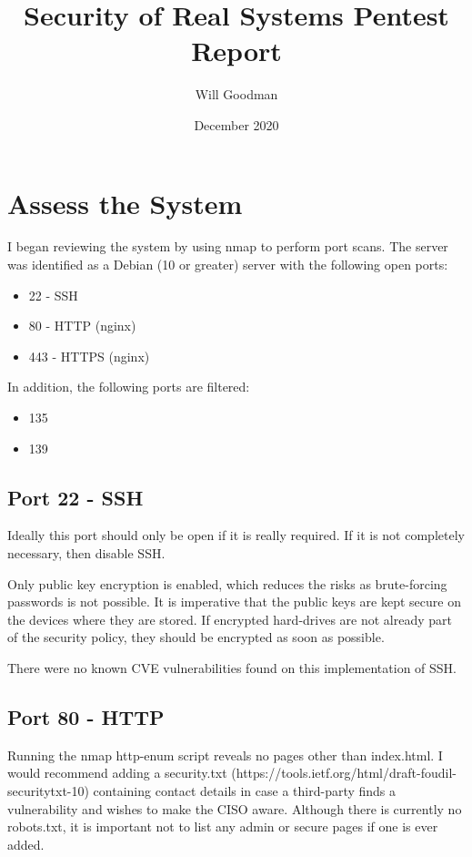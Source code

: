 \documentclass[12pt]{article}
\title{Security of Real Systems Pentest Report}
\date{December 2020}
\author{Will Goodman}
\begin{document}
  \maketitle

  \section{Assess the System}
  I began reviewing the system by using nmap to perform port scans.
  The server was identified as a Debian (10 or greater) server with the following open ports:
  \begin{itemize}
    \item 22 - SSH
    \item 80 - HTTP (nginx)
    \item 443 - HTTPS (nginx)
  \end{itemize}
  In addition, the following ports are filtered:
  \begin{itemize}
    \item 135
    \item 139
  \end{itemize}

  \subsection{Port 22 - SSH}
  Ideally this port should only be open if it is really required.
  If it is not completely necessary, then disable SSH.

  Only public key encryption is enabled, which reduces the risks as brute-forcing passwords is not possible.
  It is imperative that the public keys are kept secure on the devices where they are stored.
  If encrypted hard-drives are not already part of the security policy, they should be encrypted as soon as possible.

  There were no known CVE vulnerabilities found on this implementation of SSH.

  \subsection{Port 80 - HTTP}
  Running the nmap http-enum script reveals no pages other than index.html.
  I would recommend adding a security.txt (https://tools.ietf.org/html/draft-foudil-securitytxt-10) containing contact details in case a third-party finds a vulnerability and wishes to make the CISO aware.
  Although there is currently no robots.txt, it is important not to list any admin or secure pages if one is ever added.
\end{document}
